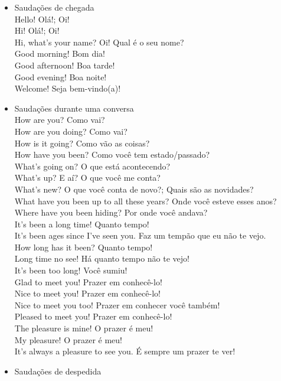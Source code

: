 \documentclass[12pt,a4paper]{article} %
\begin{document}
	\begin{itemize}
		\item Saudações de chegada\\
Hello! 	Olá!; Oi!\\
Hi! 	Olá!; Oi!\\
Hi, what's your name? 	Oi! Qual é o seu nome?\\
Good morning! 	Bom dia!\\
Good afternoon! 	Boa tarde!\\
Good evening! 	Boa noite!\\
Welcome! 	Seja bem-vindo(a)!
		\item Saudações durante uma conversa\\
How are you? 	Como vai?\\
How are you doing? 	Como vai?\\
How is it going? 	Como vão as coisas?\\
How have you been? 	Como você tem estado/passado?\\
What's going on? 	O que está acontecendo?\\
What's up? 	E aí? O que você me conta?\\
What's new? 	O que você conta de novo?; Quais são as novidades?\\
What have you been up to all these years? 	Onde você esteve esses anos?\\
Where have you been hiding? 	Por onde você andava?\\
It's been a long time! 	Quanto tempo!\\
It’s been ages since I’ve seen you. 	Faz um tempão que eu não te vejo.\\
How long has it been? 	Quanto tempo!\\
Long time no see! 	Há quanto tempo não te vejo!\\
It's been too long! 	Você sumiu!\\
Glad to meet you! 	Prazer em conhecê-lo!\\
Nice to meet you! 	Prazer em conhecê-lo!\\
Nice to meet you too! 	Prazer em conhecer você também!\\
Pleased to meet you! 	Prazer em conhecê-lo!\\
The pleasure is mine! 	O prazer é meu!\\
My pleasure! 	O prazer é meu!\\
It’s always a pleasure to see you. 	É sempre um prazer te ver!
		\item Saudações de despedida\\

\end{itemize}
\end{document}

